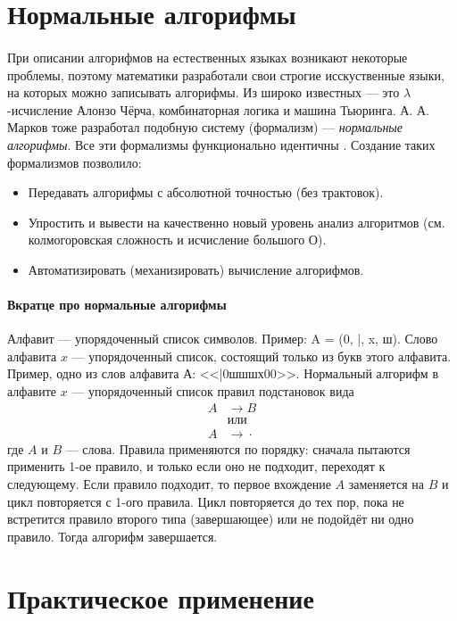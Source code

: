 \documentclass[a4paper,12pt,russian]{article}
\begin{document}
\section{Нормальные алгорифмы}
\paragraph{}При описании алгорифмов на естественных языках возникают некоторые проблемы, поэтому математики разработали свои строгие исскуственные языки, на которых можно записывать алгорифмы. Из широко известных --- это $\lambda$-исчисление Алонзо Чёрча, комбинаторная логика и машина Тьюринга. А. А. Марков тоже разработал подобную систему (формализм) --- \emph{нормальные алгорифмы}. Все эти формализмы функционально идентичны \cite[стр. 10]{markov_con}. Создание таких формализмов позволило:
\begin{itemize}
  \item Передавать алгорифмы с абсолютной точностью (без трактовок).
  \item Упростить и вывести на качественно новый уровень анализ алгоритмов (см. колмогоровская сложность и исчисление большого О).
  \item Автоматизировать (механизировать) вычисление алгорифмов.
\end{itemize}
\paragraph{Вкратце про нормальные алгорифмы} Алфавит --- упорядоченный список символов. Пример: A = (0, |, x, ш). Слово алфавита $x$ --- упорядоченный список, состоящий только из букв этого алфавита. Пример, одно из слов алфавита А: <<|0шшшх00>>. Нормальный алгорифм в алфавите $x$ --- упорядоченный список правил подстановок вида
\begin{align*}
  A &\rightarrow B\\
  &\text{или}\\
  A & \rightarrow\!\cdot
\end{align*}
где $A$ и $B$ --- слова. Правила применяются по порядку: сначала пытаются применить 1-ое правило, и только если оно не подходит, переходят к следующему. Если правило подходит, то первое вхождение $A$ заменяется на $B$ и цикл повторяется с 1-ого правила. Цикл повторяется до тех пор, пока не встретится правило второго типа (завершающее) или не подойдёт ни одно правило. Тогда алгорифм завершается.

\section{Практическое применение}
\end{document}
